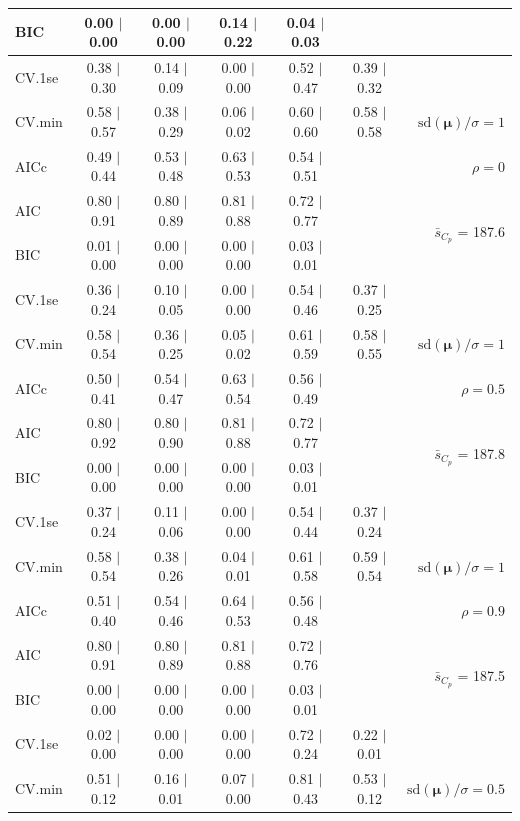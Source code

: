 \documentclass[12pt]{article}
\newcommand{\mr}[1]{\mathrm{#1}}
\newcommand{\bm}[1]{\mathbf{#1}}
\begin{document}
\begin{table}[p]
\begin{center}
\begin{tabular}{l*{5}{c}|r}
BIC & 0.00 $\mid$ 0.00 & 0.00 $\mid$ 0.00 & 0.14 $\mid$ 0.22 & 0.04 $\mid$ 0.03 & & \\
 \hline 
CV.1se & 0.38 $\mid$ 0.30 & 0.14 $\mid$ 0.09 & 0.00 $\mid$ 0.00 & 0.52 $\mid$ 0.47 & 0.39 $\mid$ 0.32 &\\
CV.min & 0.58 $\mid$ 0.57 & 0.38 $\mid$ 0.29 & 0.06 $\mid$ 0.02 & 0.60 $\mid$ 0.60 & 0.58 $\mid$ 0.58 &  $\mr{sd}(\bm{\mu})/\sigma=1$ \\
AICc & 0.49 $\mid$ 0.44 & 0.53 $\mid$ 0.48 & 0.63 $\mid$ 0.53 & 0.54 $\mid$ 0.51 & & $\rho=0$ \\
AIC & 0.80 $\mid$ 0.91 & 0.80 $\mid$ 0.89 & 0.81 $\mid$ 0.88 & 0.72 $\mid$ 0.77 & & \multirow{2}{*}{$\bar{s}_{C_p}$ = 187.6} \\
BIC & 0.01 $\mid$ 0.00 & 0.00 $\mid$ 0.00 & 0.00 $\mid$ 0.00 & 0.03 $\mid$ 0.01 & & \\
 \hline 
CV.1se & 0.36 $\mid$ 0.24 & 0.10 $\mid$ 0.05 & 0.00 $\mid$ 0.00 & 0.54 $\mid$ 0.46 & 0.37 $\mid$ 0.25 &\\
CV.min & 0.58 $\mid$ 0.54 & 0.36 $\mid$ 0.25 & 0.05 $\mid$ 0.02 & 0.61 $\mid$ 0.59 & 0.58 $\mid$ 0.55 &  $\mr{sd}(\bm{\mu})/\sigma=1$ \\
AICc & 0.50 $\mid$ 0.41 & 0.54 $\mid$ 0.47 & 0.63 $\mid$ 0.54 & 0.56 $\mid$ 0.49 & & $\rho=0.5$ \\
AIC & 0.80 $\mid$ 0.92 & 0.80 $\mid$ 0.90 & 0.81 $\mid$ 0.88 & 0.72 $\mid$ 0.77 & & \multirow{2}{*}{$\bar{s}_{C_p}$ = 187.8} \\
BIC & 0.00 $\mid$ 0.00 & 0.00 $\mid$ 0.00 & 0.00 $\mid$ 0.00 & 0.03 $\mid$ 0.01 & & \\
 \hline 
CV.1se & 0.37 $\mid$ 0.24 & 0.11 $\mid$ 0.06 & 0.00 $\mid$ 0.00 & 0.54 $\mid$ 0.44 & 0.37 $\mid$ 0.24 &\\
CV.min & 0.58 $\mid$ 0.54 & 0.38 $\mid$ 0.26 & 0.04 $\mid$ 0.01 & 0.61 $\mid$ 0.58 & 0.59 $\mid$ 0.54 &  $\mr{sd}(\bm{\mu})/\sigma=1$ \\
AICc & 0.51 $\mid$ 0.40 & 0.54 $\mid$ 0.46 & 0.64 $\mid$ 0.53 & 0.56 $\mid$ 0.48 & & $\rho=0.9$ \\
AIC & 0.80 $\mid$ 0.91 & 0.80 $\mid$ 0.89 & 0.81 $\mid$ 0.88 & 0.72 $\mid$ 0.76 & & \multirow{2}{*}{$\bar{s}_{C_p}$ = 187.5} \\
BIC & 0.00 $\mid$ 0.00 & 0.00 $\mid$ 0.00 & 0.00 $\mid$ 0.00 & 0.03 $\mid$ 0.01 & & \\
 \hline 
CV.1se & 0.02 $\mid$ 0.00 & 0.00 $\mid$ 0.00 & 0.00 $\mid$ 0.00 & 0.72 $\mid$ 0.24 & 0.22 $\mid$ 0.01 &\\
CV.min & 0.51 $\mid$ 0.12 & 0.16 $\mid$ 0.01 & 0.07 $\mid$ 0.00 & 0.81 $\mid$ 0.43 & 0.53 $\mid$ 0.12 &  $\mr{sd}(\bm{\mu})/\sigma=0.5$ \\

\end{tabular}
\end{center}
\end{table}
\end{document}
